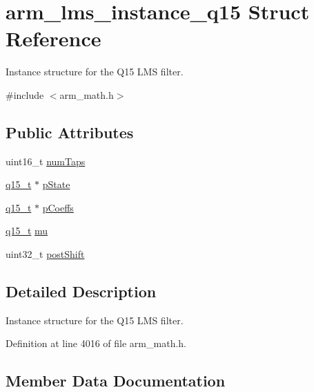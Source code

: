 \hypertarget{structarm__lms__instance__q15}{}\section{arm\+\_\+lms\+\_\+instance\+\_\+q15 Struct Reference}
\label{structarm__lms__instance__q15}


Instance structure for the Q15 L\+MS filter.  




{\ttfamily \#include $<$arm\+\_\+math.\+h$>$}

\subsection*{Public Attributes}
\begin{DoxyCompactItemize}
\item 
uint16\+\_\+t \hyperlink{structarm__lms__instance__q15_a0078e894f805af1b360369e619fb57b3}{num\+Taps}
\item 
\hyperlink{arm__math_8h_ab5a8fb21a5b3b983d5f54f31614052ea}{q15\+\_\+t} $\ast$ \hyperlink{structarm__lms__instance__q15_a9a575ff82c1e68cbb583083439260d08}{p\+State}
\item 
\hyperlink{arm__math_8h_ab5a8fb21a5b3b983d5f54f31614052ea}{q15\+\_\+t} $\ast$ \hyperlink{structarm__lms__instance__q15_a42f95368b94898eb82608e1113d18cab}{p\+Coeffs}
\item 
\hyperlink{arm__math_8h_ab5a8fb21a5b3b983d5f54f31614052ea}{q15\+\_\+t} \hyperlink{structarm__lms__instance__q15_aae46129d7cfd7f1c162cc502ed0a9d49}{mu}
\item 
uint32\+\_\+t \hyperlink{structarm__lms__instance__q15_acca5fbaef4a52ae411de24c9a0b929cf}{post\+Shift}
\end{DoxyCompactItemize}


\subsection{Detailed Description}
Instance structure for the Q15 L\+MS filter. 

Definition at line 4016 of file arm\+\_\+math.\+h.



\subsection{Member Data Documentation}
\mbox{\label{structarm__lms__instance__q15_aae46129d7cfd7f1c162cc502ed0a9d49}} 
